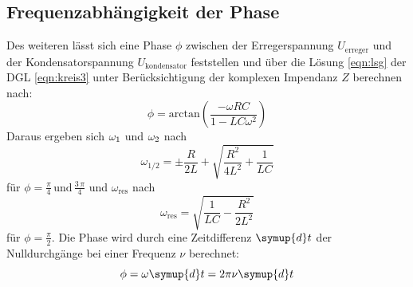 \subsection{Frequenzabhängigkeit der Phase}
Des weiteren lässt sich eine Phase $\phi$ zwischen der Erregerspannung
$U_\text{erreger}$ und der Kondensatorspannung $U_\text{kondensator}$  feststellen und über
die Lösung \eqref{eqn:lsg} der DGL \eqref{eqn:kreis3} unter Berücksichtigung der komplexen Impendanz $Z$ berechnen nach:
\begin{equation}
  \phi = \text{arctan}\left(\frac{-\omega RC}{1-LC\omega^2}\right)
  \label{eqn:phase}
\end{equation}
Daraus ergeben sich $\omega_\text1$ und $\omega_\text2$ nach
\begin{equation}
  \omega_{1/2} = \pm \frac{R}{2L} + \sqrt{\frac{R^{2}}{4L^{2}} + \frac{1}{LC}}
  \label{o12}
\end{equation}
für $\phi = \frac{\pi}{4}\,\text{und}\, \frac{3\,\pi}{4}$ und $\omega_\text{res}$ nach
\begin{equation}
  \omega_\text{res}=\sqrt{\frac{1}{LC}-\frac{R^2}{2L^2}}
  \label{eqn:ores}
\end{equation}
für $\phi = \frac{\pi}{2}$.
Die Phase wird durch eine Zeitdifferenz $\symup{d}t$ der Nulldurchgänge bei einer Frequenz $\nu$
berechnet:
\begin{equation}
  \phi = \omega \symup{d}t = 2\pi\nu \symup{d}t
\end{equation}
